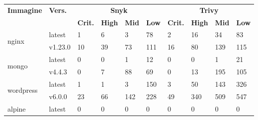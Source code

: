 \begin{table}[H]
   \centering
   \begin{tabularx}{\textwidth}{|l|l|X|X|X|X|X|X|X|X|}
      \hline
      \textbf{Immagine}          & \textbf{Vers.} & \multicolumn{4}{c|}{\textbf{Snyk}} & \multicolumn{4}{c|}{\textbf{Trivy}}                                                                                              \\ \cline{3-10}
                                 &                & \textbf{Crit.}                     & \textbf{High}                       & \textbf{Mid} & \textbf{Low} & \textbf{Crit.} & \textbf{High} & \textbf{Mid} & \textbf{Low} \\ \hline
      \multirow{2}{*}{nginx}     & latest         & 1                                  & 6                                   & 3            & 78           & 2              & 16            & 34           & 83           \\ \cline{2-10}
                                 & v1.23.0        & 10                                 & 39                                  & 73           & 111          & 16             & 80            & 139          & 115          \\ \hline
      \multirow{2}{*}{mongo}     & latest         & 0                                  & 0                                   & 1            & 12           & 0              & 0             & 1            & 21           \\ \cline{2-10}
                                 & v4.4.3         & 0                                  & 7                                   & 88           & 69           & 0              & 13            & 195          & 105          \\ \hline
      \multirow{2}{*}{wordpress} & latest         & 1                                  & 1                                   & 3            & 150          & 3              & 50            & 143          & 326          \\ \cline{2-10}
                                 & v6.0.0         & 23                                 & 66                                  & 142          & 228          & 49             & 340           & 509          & 547          \\ \hline
      \multirow{2}{*}{alpine}    & latest         & 0                                  & 0                                   & 0            & 0            & 0              & 0             & 0            & 0            \\ \cline{2-10}

\end{tabularx}
\end{table}
